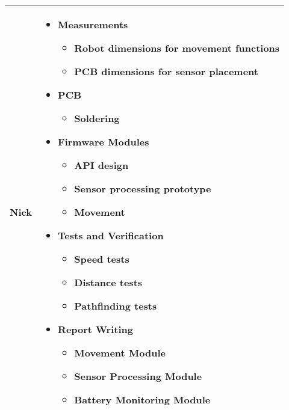 \documentclass[conference]{IEEEtran}
\begin{document}
\begin{tabularx}{\linewidth}{ | c | X | }
	\hline
	Nick & \begin{itemize}
		       \item Measurements
		             \begin{itemize}
			      \item Robot dimensions for movement functions
			      \item PCB dimensions for sensor placement
		      \end{itemize}
		       \item PCB
		             \begin{itemize}
			      \item Soldering
		      \end{itemize}
		       \item Firmware Modules
		             \begin{itemize}
			      \item API design
			      \item Sensor processing prototype
			      \item Movement
		      \end{itemize}
		       \item Tests and Verification
		             \begin{itemize}
			      \item Speed tests
			      \item Distance tests
			      \item Pathfinding tests
		      \end{itemize}
		       \item Report Writing
		             \begin{itemize}
			      \item Movement Module
			      \item Sensor Processing Module
			      \item Battery Monitoring Module
		      \end{itemize}
	       \end{itemize} \\
	\hline
\end{tabularx}
\egroup


\end{document}
